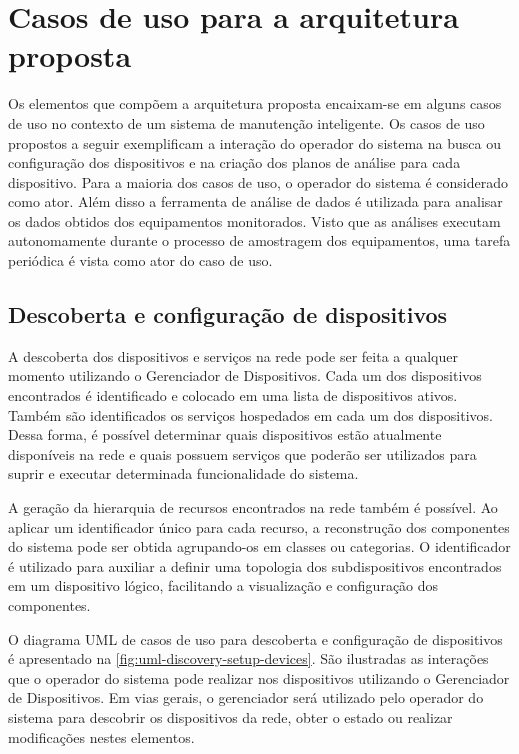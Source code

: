 \section{Casos de uso para a arquitetura proposta}

Os elementos que compõem a arquitetura proposta encaixam-se em alguns casos de uso no contexto de um
sistema de manutenção inteligente. Os casos de uso propostos a seguir exemplificam a interação do
operador do sistema na busca ou configuração dos dispositivos e na criação dos planos de análise
para cada dispositivo. Para a maioria dos casos de uso, o operador do sistema é considerado como
ator. Além disso a ferramenta de análise de dados é utilizada para analisar os dados obtidos dos
equipamentos monitorados. Visto que as análises executam autonomamente durante o processo de
amostragem dos equipamentos, uma tarefa periódica é vista como ator do caso de uso.


\subsection{Descoberta e configuração de dispositivos}

A descoberta dos dispositivos e serviços na rede pode ser feita a qualquer momento utilizando o
Gerenciador de Dispositivos. Cada um dos dispositivos encontrados é identificado e colocado em uma
lista de dispositivos ativos. Também são identificados os serviços hospedados em cada um dos
dispositivos. Dessa forma, é possível determinar quais dispositivos estão atualmente disponíveis na
rede e quais possuem serviços que poderão ser utilizados para suprir e executar determinada
funcionalidade do sistema.

A geração da hierarquia de recursos encontrados na rede também é possível. Ao aplicar um
identificador único para cada recurso, a reconstrução dos componentes do sistema pode ser obtida
agrupando-os em classes ou categorias. O identificador é utilizado para auxiliar a definir uma
topologia dos subdispositivos encontrados em um dispositivo lógico, facilitando a visualização e
configuração dos componentes.

O diagrama \gls{UML} de casos de uso para descoberta e configuração de dispositivos é apresentado na
\cref{fig:uml-discovery-setup-devices}. São ilustradas as interações que o operador do sistema pode
realizar nos dispositivos utilizando o Gerenciador de Dispositivos. Em vias gerais, o gerenciador
será utilizado pelo operador do sistema para descobrir os dispositivos da rede, obter o estado ou
realizar modificações nestes elementos.

